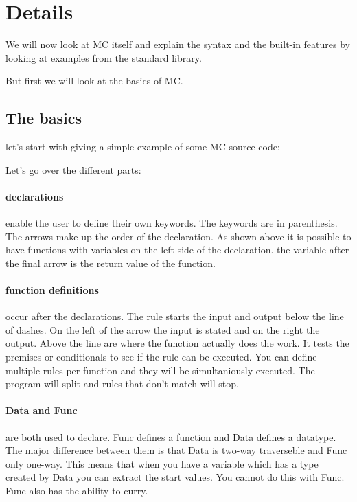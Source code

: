 \section{Details}
We will now look at MC itself and explain the syntax and the built-in features by looking at examples from the standard library.

But first we will look at the basics of MC.

\subsection{The basics}
let's start with giving a simple example of some MC source code:

Let's go over the different parts:

\paragraph{declarations} enable the user to define their own keywords.
The keywords are in parenthesis.
The arrows make up the order of the declaration.
As shown above it is possible to have functions with variables on the left side of the declaration.
the variable after the final arrow is the return value of the function.

\paragraph{function definitions} occur after the declarations.
The rule starts the input and output below the line of dashes.
On the left of the arrow the input is stated and on the right the output.
Above the line are where the function actually does the work.
It tests the premises or conditionals to see if the rule can be executed.
You can define multiple rules per function and they will be simultaniously executed.
The program will split and rules that don't match will stop.

\paragraph{Data and Func} are both used to declare. Func defines a function and Data defines a datatype.
The major difference between them is that Data is two-way traverseble and Func only one-way.
This means that when you have a variable which has a type created by Data you can extract the start values.
You cannot do this with Func.
Func also has the ability to curry.


